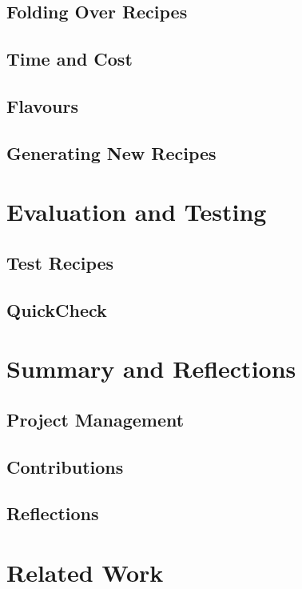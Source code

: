 \documentclass[11pt]{article}
\begin{document}
        \subsection{Folding Over Recipes}
        \subsection{Time and Cost}
        \subsection{Flavours}
        \subsection{Generating New Recipes}

    \section{Evaluation and Testing}
        \subsection{Test Recipes}
        \subsection{QuickCheck}

    \section{Summary and Reflections}
        \subsection{Project Management}
        \subsection{Contributions}
        \subsection{Reflections}

    \section{Related Work}

    \newpage
\end{document}

